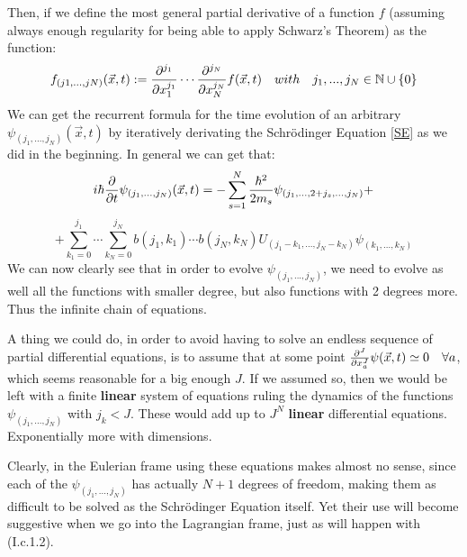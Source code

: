 \documentclass[11pt, a4paper]{article} %
\newcommand{\N}{\mathbb{N}}
\begin{document}
Then, if we define the most general partial derivative of a function $f$ (assuming always enough regularity for being able to apply Schwarz's Theorem) as the function:\vspace{-0.1cm}
\begin{equation}\label{defPdv}
f_{(j1,...,jN)}(\vec{x},t):=\pdv[j_1]{}{x_1}\cdots\pdv[j_N]{}{x_N} f(\vec{x},t) \quad with\quad j_1,...,j_N\in \N\cup \{0\}\vspace{-0.1cm}
\end{equation}
We can get the recurrent formula for the time evolution of an arbitrary $\psi_{(j_1,...,j_N)}(\vec{x},t)$ by iteratively derivating the Schrödinger Equation \eqref{SE} as we did in the beginning. In general we can get that:
\begin{equation}\label{infchain.SE}
i\hbar \pdv{}{t}\psi_{(j_1,...,j_N)}(\vec{x},t)=-\sum_{s=1}^N\frac{\hbar^2}{2m_s}\psi_{(j_1,...,2+j_s,...,j_N)}+\vspace{-0.1cm}
\end{equation}
$$
+\sum_{k_1=0}^{j_1}\cdots\sum_{k_N=0}^{j_N} b(j_1,k_1)\cdots b(j_N,k_N)U_{(j_1-k_1,...,j_N-k_N)}\psi_{(k_1,...,k_N)}
$$
We can now clearly see that in order to evolve $\psi_{(j_1,...,j_N)}$, we need to evolve as well all the functions with smaller degree, but also functions with 2 degrees more. Thus the infinite chain of equations.

A thing we could do, in order to avoid having to solve an endless sequence of partial differential equations, is to assume that at some point $\pdv[J]{}{x_a}\psi(\vec{x},t)\simeq 0\quad \forall a$, which seems reasonable for a big enough $J$. If we assumed so, then we would be left with a finite {\bf linear} system of equations ruling the dynamics of the functions $\psi_{(j_1,...,j_N)}$ with $j_k<J$. These would add up to $J^N$ {\bf linear} differential equations. Exponentially more with dimensions.

Clearly, in the Eulerian frame using these equations makes almost no sense, since each of the $\psi_{(j_1,...,j_N)}$ has actually $N+1$ degrees of freedom, making them as difficult to be solved as the Schrödinger Equation itself. Yet their use will become suggestive when we go into the Lagrangian frame, just as will happen with (I.c.1.2).\vspace{-0.3cm}
\end{document}
